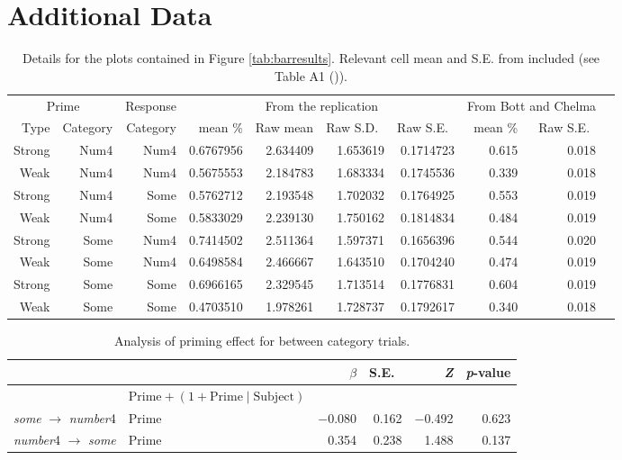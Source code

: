 \documentclass[10pt]{article}
\begin{document}
\vfill
\printbibliography



\newpage
\appendix

\section{Additional Data}

\begin{table}[h]
  \centering
  \begin{tabular}{rrrrrrrrrr}
    \hline
    \multicolumn{2}{c}{Prime} & Response & \multicolumn{4}{c}{From the replication} & \multicolumn{2}{c}{From Bott and Chelma} \\
    \cline{1-3}
    Type & Category & Category  & mean \% & Raw mean & Raw S.D.\ & Raw S.E.\ &  mean \%  & Raw S.E.\  \\
    \hline
 Strong & Num4 &  Num4 &   0.6767956 &  2.634409 & 1.653619 & 0.1714723  & 0.615 & 0.018   \\
   Weak & Num4 &  Num4 &   0.5675553 &  2.184783 & 1.683334 & 0.1745536  & 0.339 & 0.018    \\
 Strong & Num4 &  Some &   0.5762712 &  2.193548 & 1.702032 & 0.1764925  & 0.553 & 0.019    \\
   Weak & Num4 &  Some &   0.5833029 &  2.239130 & 1.750162 & 0.1814834  & 0.484 & 0.019    \\
 Strong & Some &  Num4 &   0.7414502 &  2.511364 & 1.597371 & 0.1656396  & 0.544 & 0.020    \\
   Weak & Some &  Num4 &   0.6498584 &  2.466667 & 1.643510 & 0.1704240  & 0.474 & 0.019    \\
 Strong & Some &  Some &   0.6966165 &  2.329545 & 1.713514 & 0.1776831  & 0.604 & 0.019    \\
    Weak & Some &  Some &   0.4703510 &  1.978261 & 1.728737 & 0.1792617 & 0.340 & 0.018     \\
    \hline
  \end{tabular}\vspace{-7pt}
  \caption{Details for the plots contained in Figure \ref{tab:barresults}.
  Relevant cell mean and S.E. from \citeauthor{Bott:2016aa} included (see Table A1 (\citeyear[138--139]{Bott:2016aa})).}
\end{table}
\begin{table}[ht]
  \centering
  \begin{tabular}{llrrrr}
    \hline
     & & \(\beta\) & S.E.\ & \emph{Z} & \emph{p}-value  \\
   \hline
    & \(\text{Prime} + (1 + \text{Prime} \mid \text{Subject})\) & & & & \\
    \emph{some} \(\rightarrow\) \emph{number}4 & Prime & \(-\)0.080 &  0.162 & \(-\)0.492 & 0.623 \\
    \emph{number}4 \(\rightarrow\) \emph{some} & Prime & 0.354  &  0.238 & 1.488  & 0.137 \\
    \hline
  \end{tabular}\vspace{-7pt}
  \caption{Analysis of priming effect for between category trials.}
  \label{tab:primebetweeendirection}
\end{table}
\end{document}

